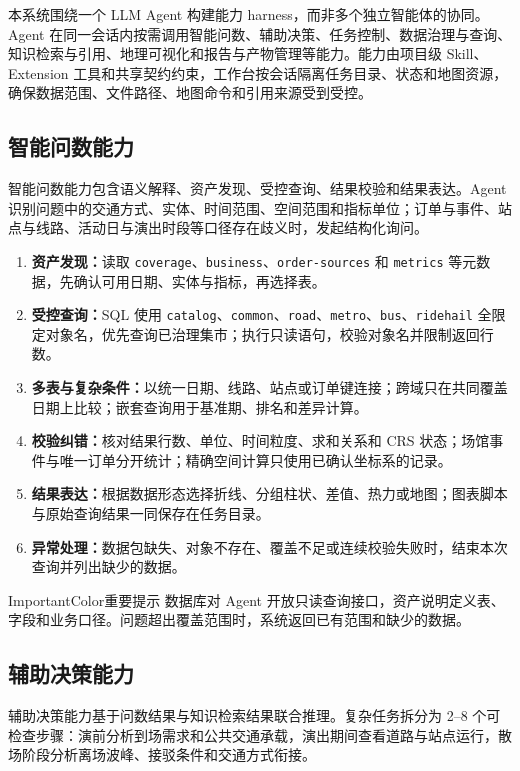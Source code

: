 \documentclass[a4paper,11pt]{article}
\newenvironment{important}{\begin{admonition}{ImportantColor}{重要提示}}{\end{admonition}}
\newcommand{\code}[1]{\texttt{#1}}
\newcommand{\term}[1]{\textbf{#1}}
\begin{document}
本系统围绕一个 LLM Agent 构建能力 harness，而非多个独立智能体的协同。Agent 在同一会话内按需调用智能问数、辅助决策、任务控制、数据治理与查询、知识检索与引用、地理可视化和报告与产物管理等能力。能力由项目级 Skill、Extension 工具和共享契约约束，工作台按会话隔离任务目录、状态和地图资源，确保数据范围、文件路径、地图命令和引用来源受到受控。

\subsection{智能问数能力}

智能问数能力包含语义解释、资产发现、受控查询、结果校验和结果表达。Agent 识别问题中的交通方式、实体、时间范围、空间范围和指标单位；订单与事件、站点与线路、活动日与演出时段等口径存在歧义时，发起结构化询问。

\begin{enumerate}
  \item \term{资产发现：}读取 \code{coverage}、\code{business}、\code{order-sources} 和 \code{metrics} 等元数据，先确认可用日期、实体与指标，再选择表。
  \item \term{受控查询：}SQL 使用 \code{catalog}、\code{common}、\code{road}、\code{metro}、\code{bus}、\code{ridehail} 全限定对象名，优先查询已治理集市；执行只读语句，校验对象名并限制返回行数。
  \item \term{多表与复杂条件：}以统一日期、线路、站点或订单键连接；跨域只在共同覆盖日期上比较；嵌套查询用于基准期、排名和差异计算。
  \item \term{校验纠错：}核对结果行数、单位、时间粒度、求和关系和 CRS 状态；场馆事件与唯一订单分开统计；精确空间计算只使用已确认坐标系的记录。
  \item \term{结果表达：}根据数据形态选择折线、分组柱状、差值、热力或地图；图表脚本与原始查询结果一同保存在任务目录。
  \item \term{异常处理：}数据包缺失、对象不存在、覆盖不足或连续校验失败时，结束本次查询并列出缺少的数据。
\end{enumerate}

\begin{important}
数据库对 Agent 开放只读查询接口，资产说明定义表、字段和业务口径。问题超出覆盖范围时，系统返回已有范围和缺少的数据。
\end{important}

\subsection{辅助决策能力}

辅助决策能力基于问数结果与知识检索结果联合推理。复杂任务拆分为 2--8 个可检查步骤：演前分析到场需求和公共交通承载，演出期间查看道路与站点运行，散场阶段分析离场波峰、接驳条件和交通方式衔接。
\end{document}
